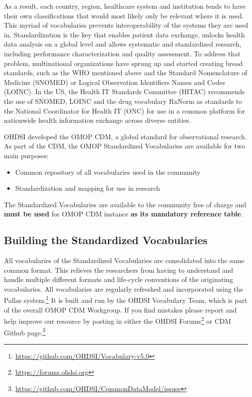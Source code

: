 \documentclass[11pt]{book}
\providecommand{\tightlist}{%
  \setlength{\itemsep}{0pt}\setlength{\parskip}{0pt}}
\let\rmarkdownfootnote\footnote%
\def\footnote{\protect\rmarkdownfootnote}
\theoremstyle{definition}
\theoremstyle{definition}
\theoremstyle{definition}
\theoremstyle{remark}
\begin{document}
As a result, each country, region, healthcare system and institution
tends to have their own classifications that would most likely only be
relevant where it is used. This myriad of vocabularies prevents
interoperability of the systems they are used in. Standardization is the
key that enables patient data exchange, unlocks health data analysis on
a global level and allows systematic and standardized research,
including performance characterization and quality assessment. To
address that problem, multinational organizations have sprung up and
started creating broad standards, such as the WHO mentioned above and
the Standard Nomenclature of Medicine (SNOMED) or Logical Observation
Identifiers Names and Codes (LOINC). In the US, the Health IT Standards
Committee (HITAC) recommends the use of SNOMED, LOINC and the drug
vocabulary RxNorm as standards to the National Coordinator for Health IT
(ONC) for use in a common platform for nationwide health information
exchange across diverse entities.

OHDSI developed the OMOP CDM, a global standard for observational
research. As part of the CDM, the OMOP Standardized Vocabularies are
available for two main purposes:

\begin{itemize}
\tightlist
\item
  Common repository of all vocabularies used in the community
\item
  Standardization and mapping for use in research
\end{itemize}

The Standardized Vocabularies are available to the community free of
charge and \textbf{must be used} for OMOP CDM instance \textbf{as its
mandatory reference table}.

\subsection{Building the Standardized
Vocabularies}\label{building-the-standardized-vocabularies}

All vocabularies of the Standardized Vocabularies are consolidated into
the same common format. This relieves the researchers from having to
understand and handle multiple different formats and life-cycle
conventions of the originating vocabularies. All vocabularies are
regularly refreshed and incorporated using the Pallas system.\footnote{\url{https://github.com/OHDSI/Vocabulary-v5.0}}
It is built and run by the OHDSI Vocabulary Team, which is part of the
overall OMOP CDM Workgroup. If you find mistakes please report and help
improve our resource by posting in either the OHDSI Forums\footnote{\url{https://forums.ohdsi.org}}
or CDM Github page.\footnote{\url{https://github.com/OHDSI/CommonDataModel/issues}}
\end{document}
